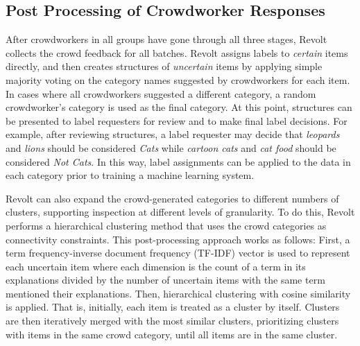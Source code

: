\subsection{Post Processing of Crowdworker Responses}
After crowdworkers in all groups have gone through all three stages, Revolt collects the crowd feedback for all batches. Revolt assigns labels to \emph{certain} items directly, and then creates structures of \emph{uncertain} items by applying simple majority voting on the category names suggested by crowdworkers for each item. In cases where all crowdworkers suggested a different category, a random crowdworker's category is used as the final category. At this point, structures can be presented to label requesters for review and to make final label decisions. For example, after reviewing structures, a label requester may decide that \emph{leopards} and \emph{lions} should be considered \emph{Cats} while \emph{cartoon cats} and \emph{cat food} should be considered \emph{Not Cats}. In this way, label assignments can be applied to the data in each category prior to training a machine learning system.


Revolt can also expand the crowd-generated categories to different numbers of clusters, supporting inspection at different levels of granularity. To do this, Revolt performs a hierarchical clustering method that uses the crowd categories as connectivity constraints. 
This post-processing approach works as follows:
First, a term frequency-inverse document frequency (TF-IDF) vector is used to represent each uncertain item where each dimension is the count of a term in its explanations divided by the number of uncertain items with the same term mentioned their explanations. Then, hierarchical clustering with cosine similarity is applied. That is, initially, each item is treated as a cluster by itself. Clusters are then iteratively merged with the most similar clusters, prioritizing clusters with items in the same crowd category, until all items are in the same cluster. 

